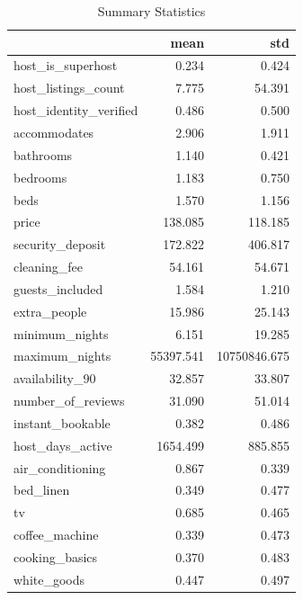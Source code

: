 \begin{table}[htp]
    \centering
    \caption{Summary Statistics}
    \label{tab:descriptive-statistic}
{\small

\begin{tabular}{lrr}
\toprule
{} &      mean &          std \\
\midrule
host\_is\_superhost      &     0.234 &        0.424 \\
host\_listings\_count    &     7.775 &       54.391 \\
host\_identity\_verified &     0.486 &        0.500 \\
accommodates           &     2.906 &        1.911 \\
bathrooms              &     1.140 &        0.421 \\
bedrooms               &     1.183 &        0.750 \\
beds                   &     1.570 &        1.156 \\
price                  &   138.085 &      118.185 \\
security\_deposit       &   172.822 &      406.817 \\
cleaning\_fee           &    54.161 &       54.671 \\
guests\_included        &     1.584 &        1.210 \\
extra\_people           &    15.986 &       25.143 \\
minimum\_nights         &     6.151 &       19.285 \\
maximum\_nights         & 55397.541 & 10750846.675 \\
availability\_90        &    32.857 &       33.807 \\
number\_of\_reviews      &    31.090 &       51.014 \\
instant\_bookable       &     0.382 &        0.486 \\
host\_days\_active       &  1654.499 &      885.855 \\
air\_conditioning       &     0.867 &        0.339 \\
bed\_linen              &     0.349 &        0.477 \\
tv                     &     0.685 &        0.465 \\
coffee\_machine         &     0.339 &        0.473 \\
cooking\_basics         &     0.370 &        0.483 \\
white\_goods            &     0.447 &        0.497 \\

\end{tabular}}
\end{table}
